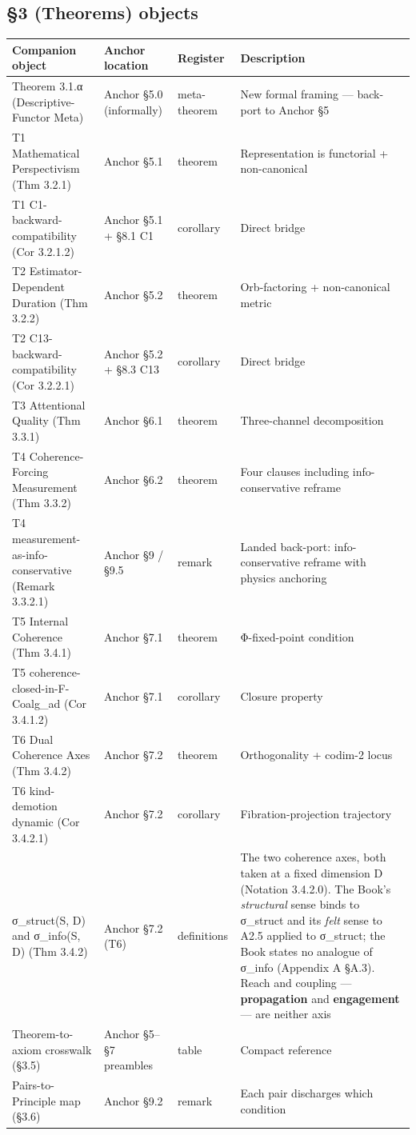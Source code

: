 \documentclass[11pt, openany]{book}
\begin{document}
\subsection{§3 (Theorems) objects}

\begingroup\setlength{\tabcolsep}{3pt}\renewcommand{\arraystretch}{1.15}\footnotesize
\begin{longtable}{p{0.50in} p{0.50in} p{0.50in} p{2.77in}}
\toprule
Companion object & Anchor location & Register & Description \\
\midrule
\endhead
\bottomrule
\endfoot
Theorem 3.1.α (Descriptive-Functor Meta) & Anchor §5.0 (informally) & meta-theorem & New formal framing --- back-port to Anchor §5 \\
\midrule
T1 Mathematical Perspectivism (Thm 3.2.1) & Anchor §5.1 & theorem & Representation is functorial + non-canonical \\
\midrule
T1 C1-backward-compatibility (Cor 3.2.1.2) & Anchor §5.1 + §8.1 C1 & corollary & Direct bridge \\
\midrule
T2 Estimator-Dependent Duration (Thm 3.2.2) & Anchor §5.2 & theorem & Orb-factoring + non-canonical metric \\
\midrule
T2 C13-backward-compatibility (Cor 3.2.2.1) & Anchor §5.2 + §8.3 C13 & corollary & Direct bridge \\
\midrule
T3 Attentional Quality (Thm 3.3.1) & Anchor §6.1 & theorem & Three-channel decomposition \\
\midrule
T4 Coherence-Forcing Measurement (Thm 3.3.2) & Anchor §6.2 & theorem & Four clauses including info-conservative reframe \\
\midrule
T4 measurement-as-info-conservative (Remark 3.3.2.1) & Anchor §9 /\allowbreak  §9.5 & remark & Landed back-port: info-conservative reframe with physics anchoring \\
\midrule
T5 Internal Coherence (Thm 3.4.1) & Anchor §7.1 & theorem & Φ-fixed-point condition \\
\midrule
T5 coherence-closed-in-F-Coalg\_\allowbreak{}ad (Cor 3.4.1.2) & Anchor §7.1 & corollary & Closure property \\
\midrule
T6 Dual Coherence Axes (Thm 3.4.2) & Anchor §7.2 & theorem & Orthogonality + codim-2 locus \\
\midrule
T6 kind-demotion dynamic (Cor 3.4.2.1) & Anchor §7.2 & corollary & Fibration-projection trajectory \\
\midrule
σ\_\allowbreak{}struct(S, D) and σ\_\allowbreak{}info(S, D) (Thm 3.4.2) & Anchor §7.2 (T6) & definitions & The two coherence axes, both taken at a fixed dimension D (Notation 3.4.2.0). The Book's \textit{structural} sense binds to σ\_\allowbreak{}struct and its \textit{felt} sense to A2.5 applied to σ\_\allowbreak{}struct; the Book states no analogue of σ\_\allowbreak{}info (Appendix A §A.3). Reach and coupling --- \textbf{propagation} and \textbf{engagement} --- are neither axis \\
\midrule
Theorem-to-axiom crosswalk (§3.5) & Anchor §5–§7 preambles & table & Compact reference \\
\midrule
Pairs-to-Principle map (§3.6) & Anchor §9.2 & remark & Each pair discharges which condition \\
\bottomrule
\end{longtable}
\endgroup
\end{document}

